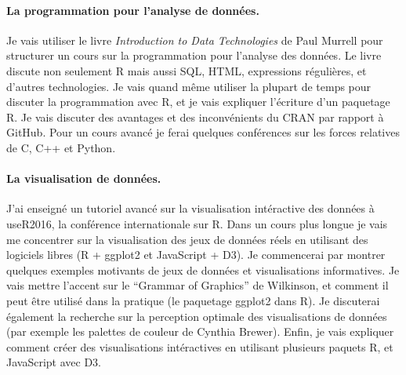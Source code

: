 \documentclass{article}
\begin{document}


\paragraph{La programmation pour l'analyse de données.} 
Je vais utiliser le livre \emph{Introduction to Data Technologies}
de Paul Murrell pour structurer un cours sur la programmation pour
l'analyse des données. Le livre discute non seulement R mais aussi
SQL, HTML, expressions régulières, et d'autres technologies. Je vais
quand même utiliser la plupart de temps pour discuter la programmation
avec R, et je vais expliquer l'écriture d'un paquetage R. Je vais
discuter des avantages et des inconvénients du CRAN par rapport à
GitHub. Pour un cours avancé je ferai quelques conférences sur les
forces relatives de C, C++ et Python.

\paragraph{La visualisation de données.} 
J'ai enseigné un tutoriel avancé sur la visualisation intéractive des
données à useR2016, la conférence internationale sur R. Dans un cours
plus longue je vais me concentrer sur la visualisation des jeux de
données réels en utilisant des logiciels libres (R + ggplot2 et
JavaScript + D3). Je commencerai par montrer quelques exemples
motivants de jeux de données et visualisations informatives. Je vais
mettre l'accent sur le ``Grammar of Graphics'' de Wilkinson, et
comment il peut être utilisé dans la pratique (le paquetage ggplot2
dans R). Je discuterai également la recherche sur la
perception optimale des visualisations de données (par exemple les
palettes de couleur de Cynthia Brewer). Enfin, je vais expliquer
comment créer des visualisations intéractives en utilisant plusieurs
paquets R, et JavaScript avec D3.
\end{document}
